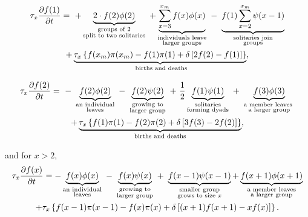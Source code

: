 \begin{multline} \label{df_of_1}
\tau_x \pdv{f(1)}{t} =\ + \underbracetwo{2 \cdot f(2) \phi(2)}{groups of 2}{split to two solitaries} \ +  \underbracetwo{\sum_{x=3}^{\xm} f(x) \phi(x)}{individuals leave}{larger groups}\ 
 -\  \underbracetwo{ f(1) \sum_{x=2}^{\xm} \psi(x-1)}{solitaries join}{groups}  \\+  \underbracetwo{\tau_x \lrc{ f(x_m) \pi (x_m ) - f(1) \pi(1) + \delta \lrb{2f(2) - f(1)}}}{ births and deaths}{},
\end{multline}
\begin{multline} \label{df_dt_2}
\tau_x \pdv{f(2)}{t} = \ -\  \underbracetwo{f(2) \phi(2)}{an individual}{leaves} 
\ - \ \underbracetwo{f(2) \psi(2) }{growing to}{larger group} \ +\  \frac{1}{2} \underbracetwo{f(1) \psi(1)}{solitaries}{forming dyads}\ +\ \underbracetwo{f(3)\phi(3)}{a member leaves }{a larger group}\\
+ \underbracetwo{ \tau_x \lrc{f(1) \pi(1) - f(2) \pi(2) + \delta \lrb{ 3 f(3) - 2 f(2)  } } }{births and deaths}{},
\end{multline}
and for $x > 2$,
\begin{multline} \label{df_dt}
\tau_x \pdv{f(x)}{t} = -\underbrace{  f(x) \phi(x) }_{\substack{\text{an individual} \\ \text{leaves} } } \ - \ \underbrace{f(x) \psi(x) }_{\substack{\text{growing to} \\ \text{larger group} } } \ +\ \underbrace{f(x-1)\psi(x-1)}_{\substack{\text{smaller group} \\ \text{grows to size $x$} } } + \underbrace{f(x+1)\phi(x+1)}_{\substack{\text{a member leaves} \\ \text{a larger group} } }\\
+ \tau_x \left\{  f(x-1)\pi(x-1) - f(x) \pi(x) + \delta \left[ (x+1)f(x+1) - xf(x) \right]  \right\}.
\end{multline}

